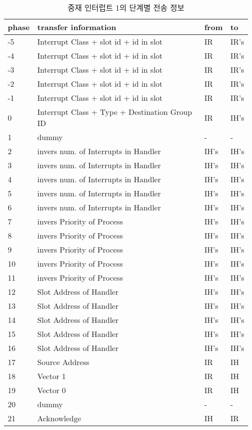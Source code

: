 %
%
\begin{table}[htbp]
\caption{중재 인터럽트 1의 단계별 전송 정보}\label{table:arb-int}
   \begin{center}
   \begin{tabular}{|l|l|l|l|} \hline
	phase & transfer information & from & to \\
\hline \hline
	-5 & Interrupt Class + slot id + id in slot & IR & IR's \\
	-4 & Interrupt Class + slot id + id in slot & IR & IR's \\
	-3 & Interrupt Class + slot id + id in slot & IR & IR's \\
	-2 & Interrupt Class + slot id + id in slot & IR & IR's \\
	-1 & Interrupt Class + slot id + id in slot & IR & IR's \\ \hline
	0 & Interrupt Class + Type + Destination Group ID & IR & IH's \\ \hline
	1 & dummy                                         & - & - \\ \hline
	2 & invers num. of Interrupts in Handler & IH's & IH's \\
	3 & invers num. of Interrupts in Handler & IH's & IH's \\
	4 & invers num. of Interrupts in Handler & IH's & IH's \\
	5 & invers num. of Interrupts in Handler & IH's & IH's \\
	6 & invers num. of Interrupts in Handler & IH's & IH's \\ \hline
	7 & invers Priority of Process & IH's & IH's \\
	8 & invers Priority of Process & IH's & IH's \\
	9 & invers Priority of Process & IH's & IH's \\
	10 & invers Priority of Process & IH's & IH's \\
	11 & invers Priority of Process & IH's & IH's \\ \hline
	12 & Slot Address of Handler & IH's & IH's \\
	13 & Slot Address of Handler & IH's & IH's \\
	14 & Slot Address of Handler & IH's & IH's \\
	15 & Slot Address of Handler & IH's & IH's \\
	16 & Slot Address of Handler & IH's & IH's \\ \hline
	17 & Source Address & IR & IH \\ \hline
	18 & Vector 1 & IR & IH \\ \hline
	19 & Vector 0 & IR & IH \\ \hline
	20 & dummy & - & - \\ \hline
	21 & Acknowledge & IH & IR \\ \hline
   \end{tabular}
   \end{center}
\end{table}
%
%
